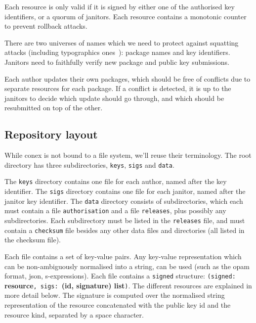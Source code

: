 \documentclass[nocopyrightspace]{sigplanconf}
\begin{document}
Each resource is only valid if it is signed by either one of the authorised key identifiers, or a quorum of janitors.
Each resource contains a monotonic counter to prevent rollback attacks.

There are two universes of names which we need to protect against squatting attacks (including typographics ones~\cite{typo}): package names and key identifiers.
Janitors need to faithfully verify new package and public key submissions.

Each author updates their own packages, which should be free of conflicts due to separate resources for each package.
If a conflict is detected, it is up to the janitors to decide which update should go through, and which should be resubmitted on top of the other.

\subsection{Repository layout}
While conex is not bound to a file system, we'll reuse their terminology.
The root directory has three subdirectories, \texttt{keys}, \texttt{sigs} and \texttt{data}.

The \texttt{keys} directory contains one file for each author, named after the key identifier.
The \texttt{sigs} directory contains one file for each janitor, named after the janitor key identifier.
The \texttt{data} directory consists of subdirectories, which each must contain a file \texttt{authorisation} and a file \texttt{releases}, plus possibly any subdirectories.
Each subdirectory must be listed in the \texttt{releases} file, and must contain a \texttt{checksum} file besides any other data files and directories (all listed in the checksum file).

Each file contains a set of key-value pairs.
Any key-value representation which can be non-ambiguously normalised into a string, can be used (such as the opam format, json, s-expressions).
Each file contains a \texttt{signed} structure: \texttt{(signed: }\textbf{resource}\texttt{, sigs: }\textbf{(id, signature) list}\texttt{)}.
The different resources are explained in more detail below.
The signature is computed over the normalised string representation of the resource concatenated with the public key id and the resource kind, separated by a space character.
\end{document}
